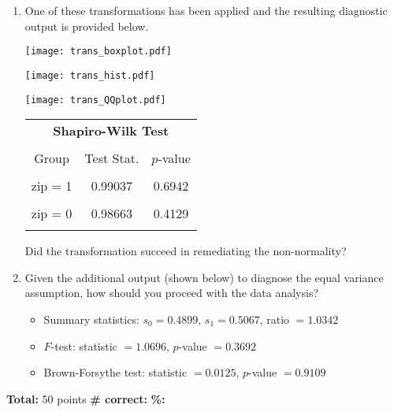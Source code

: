 \documentclass[11pt]{article}
\begin{document}
\begin{enumerate}
\begin{enumerate}
	\item One of these transformations has been applied and the resulting diagnostic output is provided below. 
	
	\begin{minipage}{0.45\textwidth}
		\texttt{[image: trans\_boxplot.pdf]}
	\end{minipage}
	\begin{minipage}{0.45\textwidth}
		\texttt{[image: trans\_hist.pdf]}
	\end{minipage}
	 
	\begin{minipage}{0.45\textwidth}
		\texttt{[image: trans\_QQplot.pdf]}
	\end{minipage}
	\begin{minipage}{0.45\textwidth}
		\begin{center}
		\footnotesize{
		\begin{tabular}{c|cc}
			\multicolumn{3}{c}{\textbf{Shapiro-Wilk Test}} \\ 
			\multicolumn{3}{c}{} \\
			Group & Test Stat. & $p$-value \\
			\hline \\
			zip = 1 & 0.99037 & 0.6942 \\ \\
			zip = 0 & 0.98663 & 0.4129 \\ \\
		\end{tabular}}
		\end{center}
	\end{minipage}
	\vspace{12pt}
	
	Did the transformation succeed in remediating the non-normality?
	
	\newpage
	\item Given the additional output (shown below) to diagnose the equal variance assumption, how should you proceed with the data analysis?
	\begin{itemize}
		\item Summary statistics: $s_0 = 0.4899$, $s_1 = 0.5067$, ratio $= 1.0342$
		\item $F$-test: statistic $= 1.0696$, $p$-value $= 0.3692$
		\item Brown-Forsythe test: statistic $= 0.0125$, $p$-value $= 0.9109$
	\end{itemize}
	\vspace{2in}
	\end{enumerate}
	
\end{enumerate}

\vfill
\textbf{Total:} 50 points \hspace{14pt} \textbf{\# correct:} \underline{\hspace{1in}}  \hspace{14pt} \textbf{\%:} \underline{\hspace{1in}} 
\end{document}
